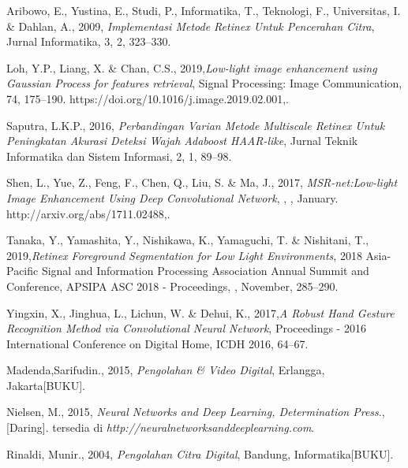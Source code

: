 \documentclass{tesisilkomugm}
\begin{document}
\begin{thebibliography}{99}
\setlength\itemindent{-30pt}\singlespacing{}

Aribowo, E., Yustina, E., Studi, P., Informatika, T., Teknologi, F., Universitas, I. 
\& Dahlan, A., 2009, \emph{Implementasi Metode Retinex Untuk Pencerahan Citra}, 
Jurnal Informatika, 3, 2, 323–330. 

Loh, Y.P., Liang, X. \& Chan, C.S., 2019,\emph{Low-light image enhancement using Gaussian Process for features retrieval}, Signal Processing: Image 
Communication, 74, 175–190. https://doi.org/10.1016/j.image.2019.02.001,. 

Saputra, L.K.P., 2016, \emph{Perbandingan Varian Metode Multiscale Retinex Untuk Peningkatan Akurasi Deteksi Wajah Adaboost HAAR-like}, Jurnal Teknik Informatika dan Sistem Informasi, 2, 1, 89–98.

Shen, L., Yue, Z., Feng, F., Chen, Q., Liu, S. \& Ma, J., 2017, \emph{MSR-net:Low-light 
Image Enhancement Using Deep Convolutional Network}, , , January. 
http://arxiv.org/abs/1711.02488,.

Tanaka, Y., Yamashita, Y., Nishikawa, K., Yamaguchi, T. \& Nishitani, T., 2019,\emph{Retinex Foreground Segmentation for Low Light Environments}, 2018 Asia-Pacific Signal and Information Processing Association Annual Summit and
Conference, APSIPA ASC 2018 - Proceedings, , November, 285–290.

Yingxin, X., Jinghua, L., Lichun, W. \& Dehui, K., 2017,\emph{A Robust Hand Gesture Recognition Method via Convolutional Neural Network}, Proceedings - 2016 
International Conference on Digital Home, ICDH 2016, 64–67. 

Madenda,Sarifudin., 2015, \emph{Pengolahan \& Video Digital}, Erlangga, 
Jakarta[BUKU].

Nielsen, M., 2015, \emph{Neural Networks and Deep Learning, Determination Press}., 
[Daring]. tersedia di \emph{http://neuralnetworksanddeeplearning.com}. 

Rinaldi, Munir., 2004, \emph{Pengolahan Citra Digital}, Bandung, Informatika[BUKU]. 


\end{thebibliography}
\end{document}
